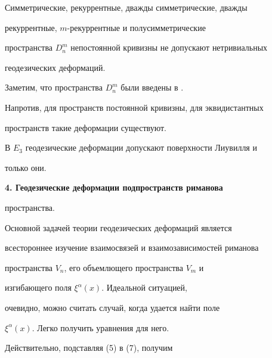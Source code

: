 \begin{thm}


Симметрические, рекуррентные, дважды симметрические, дважды


рекуррентные, $m$-рекуррентные и полусимметрические 


пространства $D^m_n$ непостоянной кривизны не допускают нетривиальных


геодезических деформаций.


\end{thm}





Заметим, что пространства $D^m_n$ были введены в \cite{ve}.





Напротив, для пространств постоянной кривизны, для эквидистантных


пространств такие деформации существуют.


В $E_3$ геодезические деформации допускают поверхности Лиувилля и


только они.


\medskip





{\bf 4. Геодезические деформации подпространств риманова


пространства.} 


Основной задачей теории геодезических деформаций является


всестороннее изучение взаимосвязей и взаимозависимостей риманова


пространства $V_n$, его объемлющего пространства $V_m$ и


изгибающего поля $\xi^\alpha (x)$. Идеальной ситуацией,


очевидно, можно считать случай, когда удается найти поле 


$\xi^\alpha (x)$. Легко получить уравнения для него.





Действительно, подставляя (5) в (7), получим


